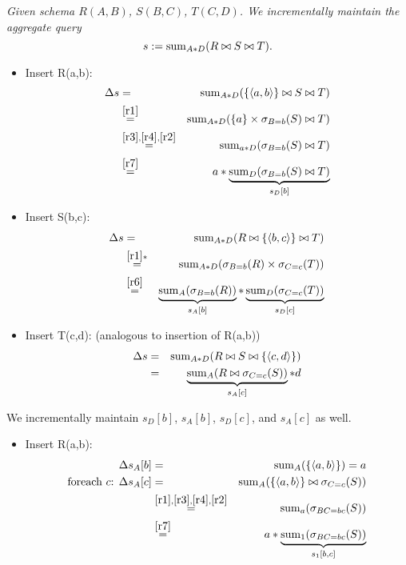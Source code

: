 \begin{example}\em
Given schema $R(A,B)$, $S(B,C)$, $T(C,D)$.
We incrementally maintain the aggregate query
\[
s := \mathrm{sum}_{A*D}(R \bowtie S \bowtie T).
\]
\begin{itemize}
\item
Insert R(a,b):
\begin{eqnarray*}
\Delta s &=& \mathrm{sum}_{A*D}(\{{\langle a,b\rangle}\} \bowtie S \bowtie T)
\\ &\stackrel{\ref{r1}}{=}&
\mathrm{sum}_{A*D}(\{a\} \times \sigma_{B=b}(S) \bowtie T)
\\ &\stackrel{\ref{r3},\ref{r4},\ref{r2}}{=}&
\mathrm{sum}_{a*D}(\sigma_{B=b}(S) \bowtie T)
\\ &\stackrel{\ref{r7}}{=}&
a * \underbrace{\mathrm{sum}_{D}(\sigma_{B=b}(S) \bowtie T)}_{s_D[b]}
\end{eqnarray*}

\item
Insert S(b,c):
\begin{eqnarray*}
\Delta s &=& \mathrm{sum}_{A*D}(R \bowtie \{{\langle b,c\rangle}\} \bowtie T)
\\ &\stackrel{\ref{r1}*}{=}&
\mathrm{sum}_{A*D}(\sigma_{B=b}(R) \times \sigma_{C=c}(T))
\\ &\stackrel{\ref{r6}}{=}&
\underbrace{\mathrm{sum}_{A}(\sigma_{B=b}(R))}_{s_A[b]} *
\underbrace{\mathrm{sum}_{D}(\sigma_{C=c}(T))}_{s_D[c]}
\end{eqnarray*}

\item
Insert T(c,d): (analogous to insertion of R(a,b))
\begin{eqnarray*}
\Delta s &=& \mathrm{sum}_{A*D}(R \bowtie S \bowtie \{{\langle c,d\rangle}\})
\\ &=&
\underbrace{\mathrm{sum}_{A}(R \bowtie \sigma_{C=c}(S))}_{s_A[c]} * d
\end{eqnarray*}
\end{itemize}

We incrementally maintain $s_D[b]$, $s_A[b]$, $s_D[c]$, and
$s_A[c]$ as well.

\begin{itemize}
\item
Insert R(a,b):
\begin{eqnarray*}
\Delta s_A[b] &=& \mathrm{sum}_{A}(\{{\langle a,b\rangle}\}) = a
\\
\mbox{foreach $c$: }
\Delta s_A[c] &=& \mathrm{sum}_{A}(\{{\langle a,b\rangle}\} \bowtie \sigma_{C=c}(S))
\\ &\stackrel{\ref{r1},\ref{r3},\ref{r4},\ref{r2}}{=}&
\mathrm{sum}_{a}(\sigma_{BC=bc}(S))
\\ &\stackrel{\ref{r7}}{=}&
a * \underbrace{\mathrm{sum}_{1}(\sigma_{BC=bc}(S))}_{s_1[b,c]}
\end{eqnarray*}


\end{itemize}
\end{example}
